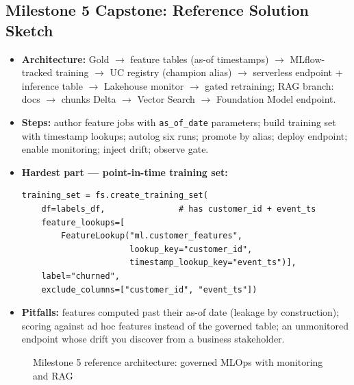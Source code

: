 \documentclass[11pt, a4paper]{article}
\begin{document}
\subsection*{Milestone 5 Capstone: Reference Solution Sketch}
\begin{itemize}[label=-, itemsep=0pt]
    \item \textbf{Architecture:} Gold $\rightarrow$ feature tables (as-of timestamps) $\rightarrow$ MLflow-tracked training $\rightarrow$ UC registry (champion alias) $\rightarrow$ serverless endpoint + inference table $\rightarrow$ Lakehouse monitor $\rightarrow$ gated retraining; RAG branch: docs $\rightarrow$ chunks Delta $\rightarrow$ Vector Search $\rightarrow$ Foundation Model endpoint.
    \item \textbf{Steps:} author feature jobs with \texttt{as\_of\_date} parameters; build training set with timestamp lookups; autolog six runs; promote by alias; deploy endpoint; enable monitoring; inject drift; observe gate.
    \item \textbf{Hardest part --- point-in-time training set:}
\begin{lstlisting}
training_set = fs.create_training_set(
    df=labels_df,               # has customer_id + event_ts
    feature_lookups=[
        FeatureLookup("ml.customer_features",
                      lookup_key="customer_id",
                      timestamp_lookup_key="event_ts")],
    label="churned",
    exclude_columns=["customer_id", "event_ts"])
\end{lstlisting}
    \item \textbf{Pitfalls:} features computed past their as-of date (leakage by construction); scoring against ad hoc features instead of the governed table; an unmonitored endpoint whose drift you discover from a business stakeholder.
\end{itemize}

\begin{figure}[htbp]
\centering
{}
\caption{Milestone 5 reference architecture: governed MLOps with monitoring and RAG}
\end{figure}
\end{document}
